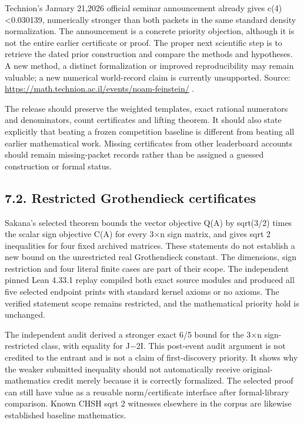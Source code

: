 \documentclass[11pt,a4paper]{article}
\begin{document}
Technion's January 21,2026 official seminar announcement already gives c(4)<0.030139, numerically stronger than both packets in the same standard density normalization. The announcement is a concrete priority objection, although it is not the entire earlier certificate or proof. The proper next scientific step is to retrieve the dated prior construction and compare the methods and hypotheses. A new method, a distinct formalization or improved reproducibility may remain valuable; a new numerical world-record claim is currently unsupported. Source: \url{https://math.technion.ac.il/events/noam-feinstein/} .

The release should preserve the weighted templates, exact rational numerators and denominators, count certificates and lifting theorem. It should also state explicitly that beating a frozen competition baseline is different from beating all earlier mathematical work. Missing certificates from other leaderboard accounts should remain missing-packet records rather than be assigned a guessed construction or formal status.

\subsection{7.2. Restricted Grothendieck certificates}
Sakana's selected theorem bounds the vector objective Q(A) by sqrt(3/2) times the scalar sign objective C(A) for every 3\ensuremath{\times}n sign matrix, and gives sqrt 2 inequalities for four fixed archived matrices. These statements do not establish a new bound on the unrestricted real Grothendieck constant. The dimensions, sign restriction and four literal finite cases are part of their scope. The independent pinned Lean 4.33.1 replay compiled both exact source modules and produced all five selected endpoint prints with standard kernel axioms or no axioms. The verified statement scope remains restricted, and the mathematical priority hold is unchanged.

The independent audit derived a stronger exact 6/5 bound for the 3\ensuremath{\times}n sign-restricted class, with equality for J\ensuremath{-}2I. This post-event audit argument is not credited to the entrant and is not a claim of first-discovery priority. It shows why the weaker submitted inequality should not automatically receive original-mathematics credit merely because it is correctly formalized. The selected proof can still have value as a reusable norm/certificate interface after formal-library comparison. Known CHSH sqrt 2 witnesses elsewhere in the corpus are likewise established baseline mathematics.
\end{document}
